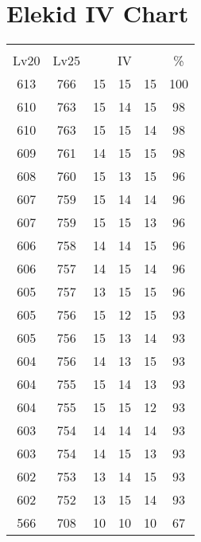 \documentclass{article}%
\begin{document}
%
\normalsize%
\section{Elekid IV Chart}%
\label{sec:Elekid IV Chart}%
\renewcommand{\arraystretch}{1.5}%
\begin{tabular}{|c|c|c|c|c|c|}%
\hline%
\multicolumn{6}{|c|}{\textcolor{white}{ 
\linebreak{Elekid}
}%
\cellcolor{black}}\\%
\multicolumn{1}{|c}{Lv20}&\multicolumn{1}{c|}{Lv25}&\multicolumn{3}{c|}{IV}&\multicolumn{1}{|c|}{\%}\\%
\hline%
\rowcolor{color100}%
613&766&15&15&15&100\\%
\hline%
\rowcolor{color98}%
610&763&15&14&15&98\\%
\hline%
\rowcolor{color98}%
610&763&15&15&14&98\\%
\hline%
\rowcolor{color98}%
609&761&14&15&15&98\\%
\hline%
\rowcolor{color96}%
608&760&15&13&15&96\\%
\hline%
\rowcolor{color96}%
607&759&15&14&14&96\\%
\hline%
\rowcolor{color96}%
607&759&15&15&13&96\\%
\hline%
\rowcolor{color96}%
606&758&14&14&15&96\\%
\hline%
\rowcolor{color96}%
606&757&14&15&14&96\\%
\hline%
\rowcolor{color96}%
605&757&13&15&15&96\\%
\hline%
\rowcolor{color93}%
605&756&15&12&15&93\\%
\hline%
\rowcolor{color93}%
605&756&15&13&14&93\\%
\hline%
\rowcolor{color93}%
604&756&14&13&15&93\\%
\hline%
\rowcolor{color93}%
604&755&15&14&13&93\\%
\hline%
\rowcolor{color93}%
604&755&15&15&12&93\\%
\hline%
\rowcolor{color93}%
603&754&14&14&14&93\\%
\hline%
\rowcolor{color93}%
603&754&14&15&13&93\\%
\hline%
\rowcolor{color93}%
602&753&13&14&15&93\\%
\hline%
\rowcolor{color93}%
602&752&13&15&14&93\\%
\hline%
\rowcolor{color91}%
566&708&10&10&10&67\\%
\end{tabular}

%
\end{document}
